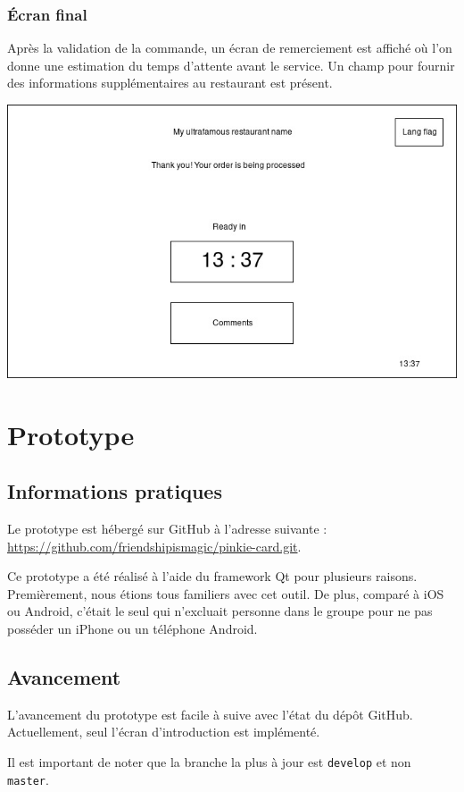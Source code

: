 \documentclass[a4paper,12pt]{article}
\begin{document}
\subsubsection{Écran final}

Après la validation de la commande, un écran de remerciement est affiché où l'on donne une estimation du temps
d'attente avant le service. Un champ pour fournir des informations supplémentaires au restaurant est présent.

\begin{center}
	\includegraphics[width=\textwidth]{final_screen.jpg}
\end{center}

\section{Prototype}

\subsection{Informations pratiques}

Le prototype est hébergé sur GitHub à l'adresse suivante : \\
\url{https://github.com/friendshipismagic/pinkie-card.git}.

Ce prototype a été réalisé à l'aide du framework Qt pour plusieurs raisons. Premièrement, nous étions tous familiers
avec cet outil. De plus, comparé à iOS ou Android, c'était le seul qui n'excluait personne dans le groupe pour ne pas
posséder un iPhone ou un téléphone Android.

\subsection{Avancement}

L'avancement du prototype est facile à suive avec l'état du dépôt GitHub. Actuellement, seul l'écran d'introduction
est implémenté.

Il est important de noter que la branche la plus à jour est \texttt{develop} et non \texttt{master}.
\end{document}
